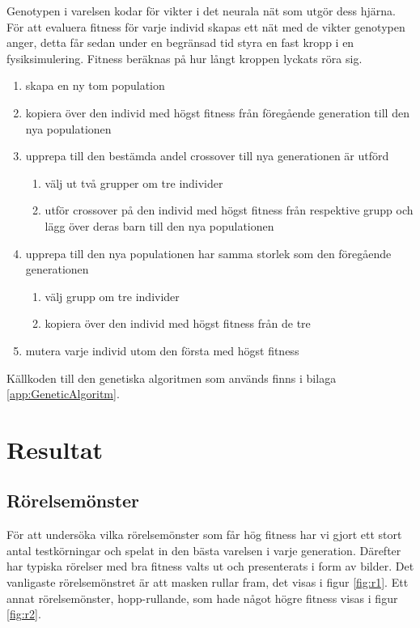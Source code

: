 \documentclass[titlepage, twocolumn, a4paper, 12pt, swedish]{article}
\begin{document}
Genotypen i varelsen kodar för vikter i det neurala nät som utgör dess hjärna. För att evaluera fitness för varje individ skapas ett nät med de vikter genotypen anger, detta får sedan under en begränsad tid styra en fast kropp i en fysiksimulering. Fitness beräknas på hur långt kroppen lyckats röra sig.

\begin{enumerate}
\item skapa en ny tom population
\item kopiera över den individ med högst fitness från föregående generation till den nya populationen
\item upprepa till den bestämda andel crossover till nya generationen är utförd
\begin{enumerate}
\item välj ut två grupper om tre individer
\item utför crossover på den individ med högst fitness från respektive grupp och lägg över deras barn till den nya populationen
\end{enumerate}
\item upprepa till den nya populationen har samma storlek som den föregående generationen
\begin{enumerate}
\item välj grupp om tre individer
\item kopiera över den individ med högst fitness från de tre
\end{enumerate}
\item mutera varje individ utom den första med högst fitness
\end{enumerate}

Källkoden till den genetiska algoritmen som används finns i bilaga \ref{app:GeneticAlgoritm}.

\section{Resultat}

\subsection{Rörelsemönster}
För att undersöka vilka rörelsemönster som får hög fitness har vi gjort ett stort antal testkörningar och spelat in den bästa varelsen i varje generation. Därefter har typiska rörelser med bra fitness valts ut och presenterats i form av bilder. Det vanligaste rörelsemönstret är att masken rullar fram, det visas i figur \vref{fig:r1}. Ett annat rörelsemönster, hopp-rullande, som hade något högre fitness visas i figur \vref{fig:r2}.
\end{document}
